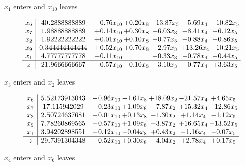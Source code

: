 \documentclass[9pt]{article}
\begin{document}
 $ x_{1} $ enters and $ x_{10} $ leaves 

 \[\begin{array}{c| c c@{\hskip 2pt} c@{\hskip 2pt} c@{\hskip 2pt} c@{\hskip 2pt} c@{\hskip 2pt} }
 x_{6}   &  40.2888888889 & -0.76 x_{10} & +  0.20 x_{8} & -13.87 x_{3} & -5.69 x_{4} & -10.82 x_{5}\\
 x_{7}   &  1.98888888889 & +  0.14 x_{10} & +  0.30 x_{8} & +  6.03 x_{3} & +  8.41 x_{4} & -6.12 x_{5}\\
 x_{2}   &  1.92222222222 & +  0.01 x_{10} & +  0.10 x_{8} & -0.77 x_{3} & +  0.88 x_{4} & -0.86 x_{5}\\
 x_{9}   &  0.344444444444 & +  0.52 x_{10} & +  0.70 x_{8} & +  2.97 x_{3} & + 13.26 x_{4} & -10.21 x_{5}\\
 x_{1}   &  4.77777777778 & -0.11 x_{10} &   & -0.33 x_{3} & -0.78 x_{4} & -0.44 x_{5}\\
\hline
z    &  21.9666666667 & -0.57 x_{10} & -0.10 x_{8} & +  3.10 x_{3} & -0.77 x_{4} & +  3.63 x_{5}\\
\end{array}\]


 $ x_{3} $ enters and $ x_{2} $ leaves 

 \[\begin{array}{c| c c@{\hskip 2pt} c@{\hskip 2pt} c@{\hskip 2pt} c@{\hskip 2pt} c@{\hskip 2pt} }
 x_{6}   &  5.52173913043 & -0.96 x_{10} & -1.61 x_{8} & + 18.09 x_{2} & -21.57 x_{4} & +  4.65 x_{5}\\
 x_{7}   &  17.115942029 & +  0.23 x_{10} & +  1.09 x_{8} & -7.87 x_{2} & + 15.32 x_{4} & -12.86 x_{5}\\
 x_{3}   &  2.50724637681 & +  0.01 x_{10} & +  0.13 x_{8} & -1.30 x_{2} & +  1.14 x_{4} & -1.12 x_{5}\\
 x_{9}   &  7.78260869565 & +  0.57 x_{10} & +  1.09 x_{8} & -3.87 x_{2} & + 16.65 x_{4} & -13.52 x_{5}\\
 x_{1}   &  3.94202898551 & -0.12 x_{10} & -0.04 x_{8} & +  0.43 x_{2} & -1.16 x_{4} & -0.07 x_{5}\\
\hline
z    &  29.7391304348 & -0.52 x_{10} & +  0.30 x_{8} & -4.04 x_{2} & +  2.78 x_{4} & +  0.17 x_{5}\\
\end{array}\]


 $ x_{4} $ enters and $ x_{6} $ leaves 
\end{document}
